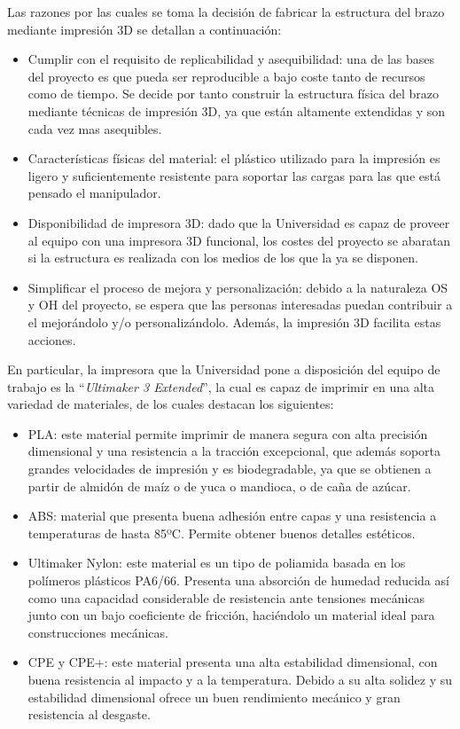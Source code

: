 Las razones por las cuales se toma la decisión de fabricar la estructura del brazo mediante impresión 3D se detallan a continuación:

\begin{itemize}
  \item Cumplir con el requisito de replicabilidad y asequibilidad: una de las bases del proyecto es que pueda ser reproducible a bajo coste tanto de recursos como de tiempo. Se decide por tanto construir la estructura física del brazo mediante técnicas de impresión 3D, ya que están altamente extendidas y son cada vez mas asequibles.
  
  \item Características físicas del material: el plástico utilizado para la impresión es ligero y suficientemente resistente para soportar las cargas para las que está pensado el manipulador.
  
  \item Disponibilidad de impresora 3D: dado que la Universidad es capaz de proveer al equipo con una impresora 3D funcional, los costes del proyecto se abaratan si la estructura es realizada con los medios de los que la ya se disponen.
  
  \item Simplificar el proceso de mejora y personalización: debido a la naturaleza \ac{OS} y \ac{OH} del proyecto, se espera que las personas interesadas puedan contribuir a el mejorándolo y/o personalizándolo. Además, la impresión 3D facilita estas acciones.
\end{itemize}

En particular, la impresora que la Universidad pone a disposición del equipo de trabajo es la ``\textit{Ultimaker 3 Extended}'', la cual es capaz de imprimir en una alta variedad de materiales, de los cuales destacan los siguientes:

\begin{itemize}
    \item \ac{PLA}\cite{AcidoPolilactico2020}: este material permite imprimir de manera segura con alta precisión dimensional y una resistencia a la tracción excepcional, que además soporta grandes velocidades de impresión y es biodegradable, ya que se obtienen a partir de almidón de maíz o de yuca o mandioca, o de caña de azúcar. 
    \item \ac{ABS}\cite{AcrilonitriloButadienoEstireno2020}: material que presenta buena adhesión entre capas y una resistencia a temperaturas de hasta 85ºC. Permite obtener buenos detalles estéticos.
    \item Ultimaker Nylon: este material es un tipo de poliamida basada en los polímeros plásticos PA6/66. Presenta una absorción de humedad reducida así como una capacidad considerable de resistencia ante tensiones mecánicas junto con un bajo coeficiente de fricción, haciéndolo un material ideal para construcciones mecánicas.
    \item CPE y CPE+: este material presenta una alta estabilidad dimensional, con buena resistencia al impacto y a la temperatura. Debido a su alta solidez y su estabilidad dimensional ofrece un buen rendimiento mecánico y gran resistencia al desgaste.
\end{itemize}

